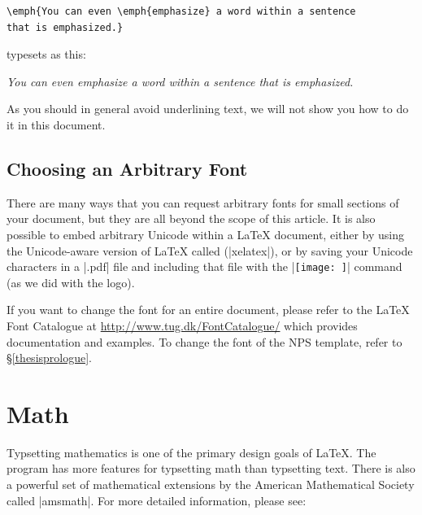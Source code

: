 \begin{center}
\begin{Verbatim}
\emph{You can even \emph{emphasize} a word within a sentence
that is emphasized.}
\end{Verbatim}
\end{center}

typesets as this:

\begin{center}
\emph{You can even \emph{emphasize} a word within a sentence that is emphasized.}
\end{center}

As you should in general avoid underlining text, we will not show you
how to do it in this document.

\subsection{Choosing an Arbitrary Font}

There are many ways that you can request arbitrary fonts for small sections of
your document, but they are all beyond the scope of this article. It is also
possible to embed arbitrary Unicode within a \LaTeX{} document, either by using
the Unicode-aware version of \LaTeX{} called
 (|xelatex|), or
by saving your Unicode characters in a |.pdf| file and including that file with
the |\texttt{[image: ]}| command (as we did with the
 logo).

If you want to change the font for an entire document, please refer to the
\LaTeX{} Font Catalogue at \url{http://www.tug.dk/FontCatalogue/} which
provides documentation and examples.  To change the font of the NPS template,
refer to \S\ref{thesisprologue}.

\section{Math}\label{math}

Typsetting mathematics is one of the primary design goals of \LaTeX. The
program  has more features for typsetting math than typsetting text. There is
also a powerful set of mathematical extensions by the American Mathematical
Society called |amsmath|.  For more detailed information, please see:

